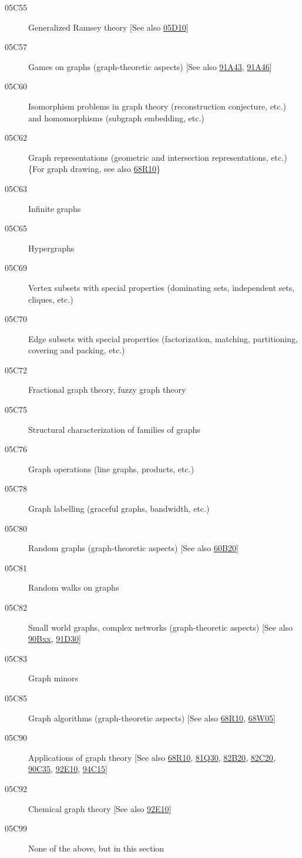 \documentclass[letterpaper]{article}
\begin{document}
\begin{description}
\item [05C55]\label{05C55} Generalized Ramsey theory [See also \hyperref[05D10]{05D10}]
\item [05C57]\label{05C57} Games on graphs (graph-theoretic aspects) [See also \hyperref[91A43]{91A43}, \hyperref[91A46]{91A46}]
\item [05C60]\label{05C60} Isomorphism problems in graph theory (reconstruction conjecture, etc.) and homomorphisms (subgraph embedding, etc.)
\item [05C62]\label{05C62} Graph representations (geometric and intersection representations, etc.) \{For graph drawing, see also \hyperref[68R10]{68R10}\}
\item [05C63]\label{05C63} Infinite graphs
\item [05C65]\label{05C65} Hypergraphs
\item [05C69]\label{05C69} Vertex subsets with special properties (dominating sets, independent sets, cliques, etc.)
\item [05C70]\label{05C70} Edge subsets with special properties (factorization, matching, partitioning, covering and packing, etc.)
\item [05C72]\label{05C72} Fractional graph theory, fuzzy graph theory
\item [05C75]\label{05C75} Structural characterization of families of graphs
\item [05C76]\label{05C76} Graph operations (line graphs, products, etc.)
\item [05C78]\label{05C78} Graph labelling (graceful graphs, bandwidth, etc.)
\item [05C80]\label{05C80} Random graphs (graph-theoretic aspects) [See also \hyperref[60B20]{60B20}]
\item [05C81]\label{05C81} Random walks on graphs
\item [05C82]\label{05C82} Small world graphs, complex networks (graph-theoretic aspects) [See also \hyperref[90Bxx]{90Bxx}, \hyperref[91D30]{91D30}]
\item [05C83]\label{05C83} Graph minors
\item [05C85]\label{05C85} Graph algorithms (graph-theoretic aspects) [See also \hyperref[68R10]{68R10}, \hyperref[68W05]{68W05}]
\item [05C90]\label{05C90} Applications of graph theory [See also \hyperref[68R10]{68R10}, \hyperref[81Q30]{81Q30}, \hyperref[82B20]{82B20}, \hyperref[82C20]{82C20}, \hyperref[90C35]{90C35}, \hyperref[92E10]{92E10}, \hyperref[94C15]{94C15}]
\item [05C92]\label{05C92} Chemical graph theory [See also \hyperref[92E10]{92E10}]
\item [05C99]\label{05C99} None of the above, but in this section
\end{description}
\end{document}

